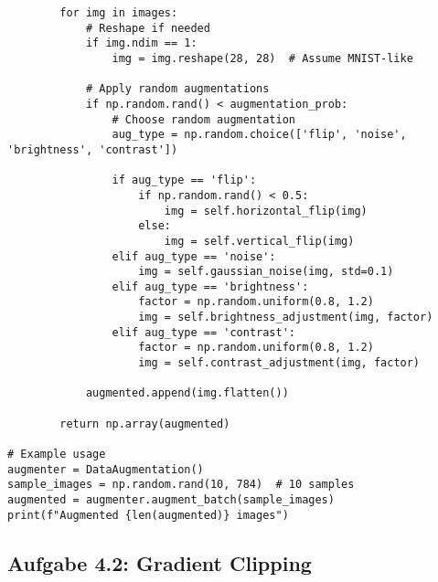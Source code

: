 ﻿\documentclass[12pt,a4paper]{article}
\begin{document}
\begin{lstlisting}
        for img in images:
            # Reshape if needed
            if img.ndim == 1:
                img = img.reshape(28, 28)  # Assume MNIST-like
            
            # Apply random augmentations
            if np.random.rand() < augmentation_prob:
                # Choose random augmentation
                aug_type = np.random.choice(['flip', 'noise', 'brightness', 'contrast'])
                
                if aug_type == 'flip':
                    if np.random.rand() < 0.5:
                        img = self.horizontal_flip(img)
                    else:
                        img = self.vertical_flip(img)
                elif aug_type == 'noise':
                    img = self.gaussian_noise(img, std=0.1)
                elif aug_type == 'brightness':
                    factor = np.random.uniform(0.8, 1.2)
                    img = self.brightness_adjustment(img, factor)
                elif aug_type == 'contrast':
                    factor = np.random.uniform(0.8, 1.2)
                    img = self.contrast_adjustment(img, factor)
            
            augmented.append(img.flatten())
        
        return np.array(augmented)

# Example usage
augmenter = DataAugmentation()
sample_images = np.random.rand(10, 784)  # 10 samples
augmented = augmenter.augment_batch(sample_images)
print(f"Augmented {len(augmented)} images")
\end{lstlisting}

\subsection{Aufgabe 4.2: Gradient Clipping}
\end{document}
